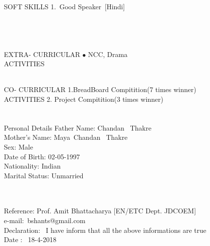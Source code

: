 \documentclass[10pt]{article}
\begin{document}
\begin{flushleft}
	\indent \\
	\indent SOFT SKILLS \hspace{0.72in}1.\ Good Speaker\ [Hindi]\\

	\indent \\
	\indent \\
	\indent \\
	\indent \\
	\indent EXTRA-
	CURRICULAR \hspace{0.08in}$\bullet$ NCC, Drama\\
	\indent ACTIVITIES %

	\indent \\
	\indent CO-
	CURRICULAR \hspace{0.4in}1.BreadBoard Compitition(7 times winner)\\
	\indent ACTIVITIES \hspace{0.83in}2. Project Compitition(3 times winner) \\ 
	
    \indent \\
    \indent \\
   
    \indent  Personal Details \hspace{0.3in} Father Name:\hspace{0.25in} Chandan \ Thakre \\							
    \hspace{1.37in}Mother's Name: \hspace{0.07in} Maya\ Chandan \ Thakre  \\
    \hspace{1.33in} Sex: \hspace{0.8in}  Male\\
    \hspace{1.33in}	Date of Birth:\hspace{0.25in} 02-05-1997\\
    \hspace{1.33in} Nationality: \hspace{0.34in} Indian\\
    \hspace{1.32in} Marital Status:\hspace{0.2in} Unmarried
    
    \indent\\
    \indent\\
	\indent Reference\hspace{0.72in}: Prof. Amit Bhattacharya [EN/ETC Dept. JDCOEM]\\ \hspace{1.5in}e-mail:\ bshants@gmail.com\\
	\indent Declaration\hspace{0.6in}: \ I have inform that all the above informations are true\\
	\indent Date \hspace{0.97in}: \ 18-4-2018\\

	\end{flushleft}
\end{document}
